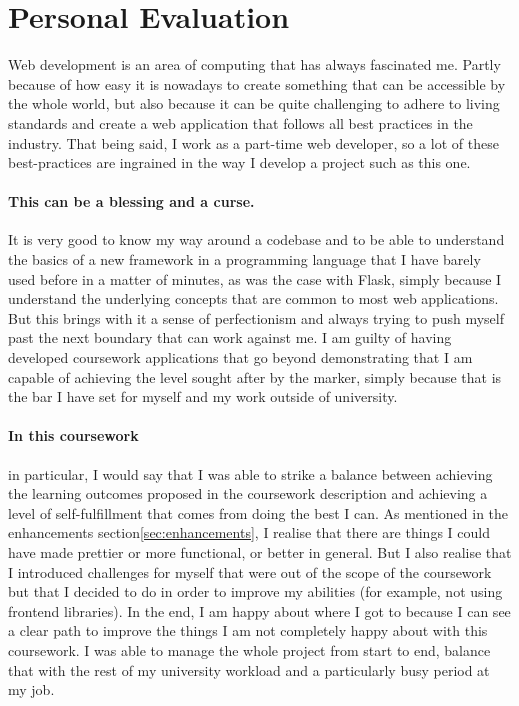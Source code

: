 \documentclass[10pt, a4paper]{article}
\begin{document}
\section{Personal Evaluation}
	Web development is an area of computing that has always fascinated me. Partly because of how easy it is nowadays to create something that can be accessible by the whole world, but also because it can be quite challenging to adhere to living standards and create a web application that follows all best practices in the industry.
	That being said, I work as a part-time web developer, so a lot of these best-practices are ingrained in the way I develop a project such as this one.
	\paragraph{This can be a blessing and a curse.} It is very good to know my way around a codebase and to be able to understand the basics of a new framework in a programming language that I have barely used before in a matter of minutes, as was the case with Flask, simply because I understand the underlying concepts that are common to most web applications. But this brings with it a sense of perfectionism and always trying to push myself past the next boundary that can work against me. I am guilty of having developed coursework applications that go beyond demonstrating that I am capable of achieving the level sought after by the marker, simply because that is the bar I have set for myself and my work outside of university.
	\paragraph{In this coursework} in particular, I would say that I was able to strike a balance between achieving the learning outcomes proposed in the coursework description and achieving a level of self-fulfillment that comes from doing the best I can. As mentioned in the enhancements section\ref{sec:enhancements}, I realise that there are things I could have made prettier or more functional, or better in general. But I also realise that I introduced challenges for myself that were out of the scope of the coursework but that I decided to do in order to improve my abilities (for example, not using frontend libraries).
	In the end, I am happy about where I got to because I can see a clear path to improve the things I am not completely happy about with this coursework. I was able to manage the whole project from start to end, balance that with the rest of my university workload and a particularly busy period at my job.
	
\end{document}
